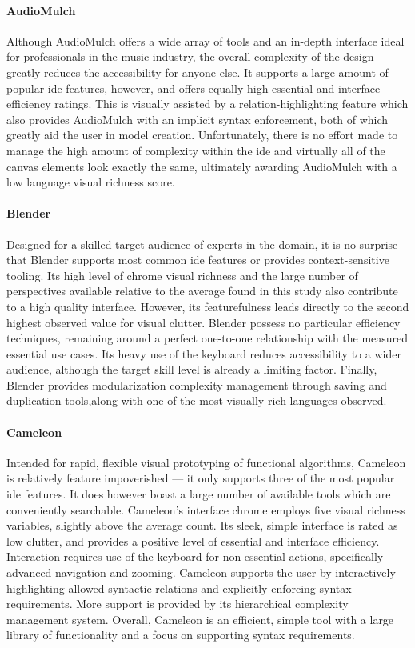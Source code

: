 \paragraph{AudioMulch} Although AudioMulch offers a wide array of tools and
an in-depth interface ideal for professionals in the music industry, the
overall complexity of the design greatly reduces the accessibility for
anyone else. It supports a large amount of popular \ac{ide} features,
however, and offers equally high essential and interface efficiency
ratings. This is visually assisted by a relation-highlighting feature which
also provides AudioMulch with an implicit syntax enforcement, both of which
greatly aid the user in model creation. Unfortunately, there is no effort
made to manage the high amount of complexity within the \ac{ide} and
virtually all of the canvas elements look exactly the same, ultimately
awarding AudioMulch with a low language visual richness score.

\paragraph{Blender} Designed for a skilled target audience of experts in
the domain, it is no surprise that Blender supports most common \ac{ide}
features or provides context-sensitive tooling. Its high level of chrome
visual richness and the large number of perspectives available relative to
the average found in this study also contribute to a high quality
interface. However, its featurefulness leads directly to the second highest
observed value for visual clutter. Blender possess no particular efficiency
techniques, remaining around a perfect one-to-one relationship with the
measured essential use cases. Its heavy use of the keyboard reduces
accessibility to a wider audience, although the target skill level is
already a limiting factor. Finally, Blender provides modularization
complexity management through saving and duplication tools,along with one
of the most visually rich languages observed.

\paragraph{Cameleon} Intended for rapid, flexible visual prototyping of
functional algorithms, Cameleon is relatively feature impoverished --- it
only supports three of the most popular \ac{ide} features. It does however
boast a large number of available tools which are conveniently searchable.
Cameleon's interface chrome employs five visual richness variables,
slightly above the average count. Its sleek, simple interface is rated as
low clutter, and provides a positive level of essential and interface
efficiency. Interaction requires use of the keyboard for non-essential
actions, specifically advanced navigation and zooming. Cameleon supports
the user by interactively highlighting allowed syntactic relations and
explicitly enforcing syntax requirements. More support is provided by its
hierarchical complexity management system. Overall, Cameleon is an
efficient, simple tool with a large library of functionality and a focus on
supporting syntax requirements.

